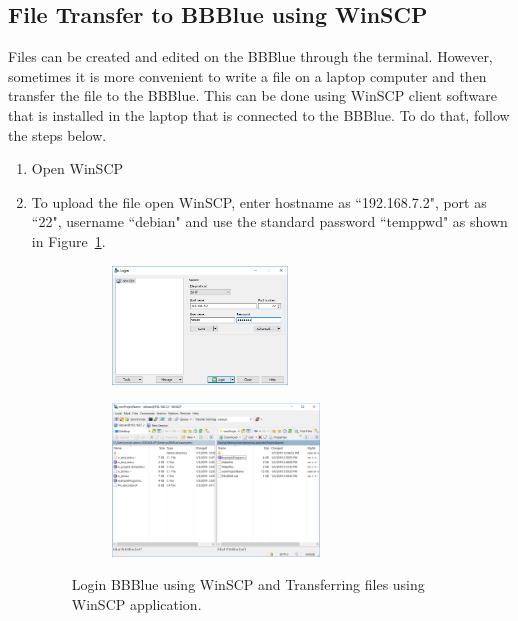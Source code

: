   \subsection{File Transfer to BBBlue using WinSCP} \label{FileTransferWinSCP}
  Files can be created and edited on the BBBlue through the terminal. However,
  sometimes it is more convenient to write a file on a laptop computer and then
  transfer the file to the BBBlue. This can be done using WinSCP client software
  that is installed in the laptop that is connected to the BBBlue. To do that, follow the steps below.
%
\begin{enumerate}
    \item Open WinSCP
    
    \item  To upload the file open WinSCP, enter hostname as ``192.168.7.2", port as ``22", username ``debian" and use the standard password ``temppwd" as shown in Figure~\ref{fig:winSCPlogin}. %
    \begin{figure}
      \begin{subfigure}[b]{\linewidth}
        \centering
        \includegraphics[width= 0.55\textwidth]{figs/img/Lab0/winSCP_login.png}
        \caption{}
        \label{fig:winSCPlogin}
      \end{subfigure}
      \begin{subfigure}[b]{\linewidth}
        \centering
        \includegraphics[width= 0.65\textwidth]{figs/img/Lab0/winSCP-C.PNG}        
        \caption{}
        \label{fig:winApp}
      \end{subfigure}
      \caption{ Login BBBlue using WinSCP and
         Transferring files using WinSCP application.}
    \end{figure}
    

\end{enumerate}
